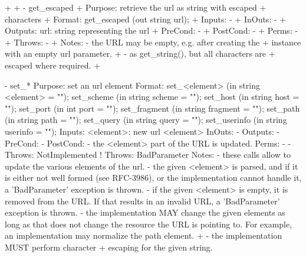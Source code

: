 \begin{myspec}
+
+   - get_escaped
+     Purpose:  retrieve the url as string with escaped
+               characters
+     Format:   get_escaped          (out string url);
+     Inputs:   -
+     InOuts:   -
+     Outputs:  url:                  string representing the url
+     PreCond:  -
+     PostCond: -
+     Perms:    -
+     Throws:   -
+     Notes:    - the URL may be empty, e.g. after creating the
+                 instance with an empty url parameter.
+               - as get_string(), but all characters are 
+                 escaped where required.
+
 
    - set_*
      Purpose:  set an url element
      Format:   set_<element>       (in  string <element> = "");
                set_scheme          (in  string scheme    = "");
                set_host            (in  string host      = "");
                set_port            (in  int    port      = "");
                set_fragment        (in  string fragment  = "");
                set_path            (in  string path      = "");
                set_query           (in  string query     = "");
                set_userinfo        (in  string userinfo  = "");
      Inputs:   <element>:           new url <element>
      InOuts:   -
      Outputs:  -
      PreCond:  -
      PostCond: - the <element> part of the URL is updated.
      Perms:    -
-     Throws:   NotImplemented
!     Throws:   BadParameter
      Notes:    - these calls allow to update the various
                  elements of the url.  
                - the given <element> is parsed, and if it is
                  either not well formed (see RFC-3986), or the
                  implementation cannot handle it, a
                  'BadParameter' exception is thrown.
                - if the given <element> is empty, it is removed
                  from the URL.  If that results in an invalid
                  URL, a 'BadParameter' exception is thrown.
                - the implementation MAY change the given
                  elements as long as that does not change the
                  resource the URL is pointing to.  For
                  example, an implementation may normalize the
                  path element.
+               - the implementation MUST perform character 
+                 escaping for the given string.
 

\end{myspec}

